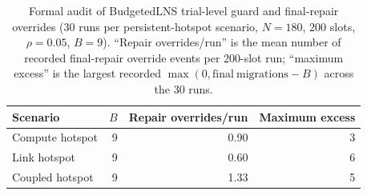 \begin{table}[H]
\centering
\caption{Formal audit of BudgetedLNS trial-level guard and final-repair overrides (30 runs per persistent-hotspot scenario, $N=180$, 200 slots, $\rho=0.05$, $B=9$). ``Repair overrides/run'' is the mean number of recorded final-repair override events per 200-slot run; ``maximum excess'' is the largest recorded $\max(0,\mathrm{final\ migrations}-B)$ across the 30 runs.}
\label{tab:guard-audit}
\scriptsize
\setlength{\tabcolsep}{5pt}
\begin{tabular}{lrrr}
\toprule
Scenario & $B$ & Repair overrides/run & Maximum excess \\
\midrule
Compute hotspot & 9 & 0.90 & 3 \\
Link hotspot & 9 & 0.60 & 6 \\
Coupled hotspot & 9 & 1.33 & 5 \\
\bottomrule
\end{tabular}
\end{table}
